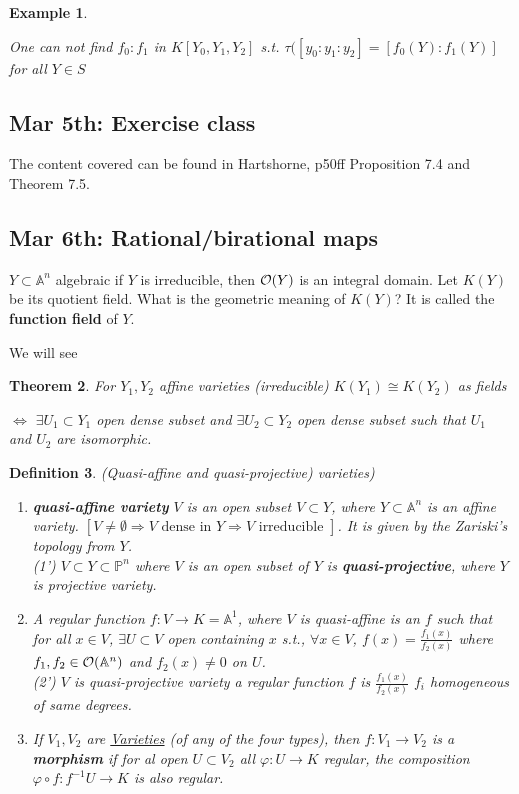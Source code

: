 \documentclass[11pt]{article}
\newtheorem{thm}{Theorem}[section]
\newtheorem{dfn}[thm]{Definition}
\newtheorem{ex}[thm]{Example}
\newcommand{\affn}{\mathbb A}
\newcommand{\proj}{\mathbb P}
\newcommand{\calo}{{\cal O}}
\newcommand{\Lrta}{\Longrightarrow}
\newcommand{\lrta}{\longrightarrow}
\newcommand{\Llrta}{\Longleftrightarrow}
\begin{document}
\begin{ex}
\begin{enumerate}[label=(\arabic*)]
One can not find $f_0:f_1$ in $K[Y_0,Y_1,Y_2]$ s.t. $\tau([y_0:y_1:y_2]=[f_0(Y):f_1(Y)]$ for all $Y\in S$
\end{enumerate}
\end{ex}

\subsection{Mar 5th: Exercise class}
The content covered can be found in Hartshorne, p50ff Proposition 7.4 and Theorem 7.5.


\subsection{Mar 6th: Rational/birational maps}

$Y\subset \affn^n$ algebraic if $Y$ is irreducible, then $\calo(Y)$ is an integral domain. Let $K(Y)$ be its quotient field. What is the geometric meaning of $K(Y)$? It is called the \textbf{function field} of $Y$.

We will see
\begin{thm}
For $Y_1,Y_2$ affine varieties (irreducible) $K(Y_1)\cong K(Y_2)$ as fields

$\Llrta$ $\exists U_1\subset Y_1$ open dense subset and $\exists U_2\subset Y_2$ open dense subset such that $U_1$ and $U_2$ are isomorphic.
\end{thm}
\begin{dfn}
(Quasi-affine  and quasi-projective) varieties)
\begin{enumerate}%
  \item \textbf{quasi-affine variety} $V$ is an open subset $V\subset Y$, where $Y\subset \affn^n$ is an affine variety. $[V\neq \emptyset\Lrta V\text{ dense in } Y\Lrta V\text{ irreducible }]$. It is given by the Zariski's topology from $Y$.\\
  (1') $V\subset Y\subset \proj^n$ where $V$ is an open subset of $Y$ is \textbf{quasi-projective}, where $Y$ is projective variety.
  \item A regular function $f:V\lrta K=\affn^1$, where $V$ is quasi-affine is an $f$ such that for all $x\in V$, $\exists U\subset V$ open containing $x$ s.t., $\forall x\in V$, $f(x)=\frac{f_1(x)}{f_2(x)}$ where $f_1,f_2\in\calo(\affn^n)$ and $f_2(x)\neq 0$ on $U$.\\
  (2') $V$ is quasi-projective variety a regular function $f$ is $\frac{f_1(x)}{f_2(x)}$ $f_i$ homogeneous of same degrees.
  \item If $V_1,V_2$ are \underline{Varieties} (of any of the four types), then $f:V_1\lrta V_2$ is a \textbf{morphism} if for al open $U\subset V_2$ all $\varphi:U\lrta K$ regular, the composition $\varphi\circ f: f^{-1}U\lrta K$ is also regular.
  \end{enumerate}
\end{dfn}
\end{document}
